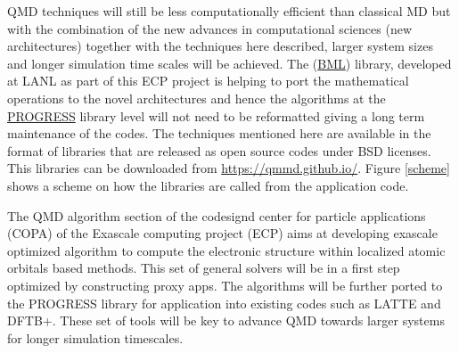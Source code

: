 QMD techniques will still be less computationally efficient than classical MD but with the combination of the new advances in computational sciences (new architectures) together with the techniques here described, larger system sizes and longer simulation time scales will be achieved. The (\href{https://github.com/qmmd/bml}{BML}) library, developed at LANL as part of this ECP project is helping to port the mathematical operations to the novel architectures and hence the algorithms at the \href{https://github.com/lanl/qmd-progress}{PROGRESS} library level will not need to be reformatted giving a long term maintenance of the codes. The techniques mentioned here are available in the format of libraries that are released as open source codes under BSD licenses. This libraries can be downloaded from \href{https://qmmd.github.io/}{https://qmmd.github.io/}. Figure \ref{scheme} shows a scheme on how the libraries are called from the application code. 

The QMD algorithm section of the codesignd center for particle applications (COPA) of the Exascale computing project (ECP) aims
at developing exascale optimized algorithm to compute the electronic structure within localized atomic orbitals based methods.
This set of general solvers will be in a first step optimized by constructing proxy apps. The algorithms will be further ported to 
the PROGRESS library for application into existing codes such as LATTE and DFTB+. These set of tools will be key to advance QMD towards larger systems for longer simulation timescales. 




